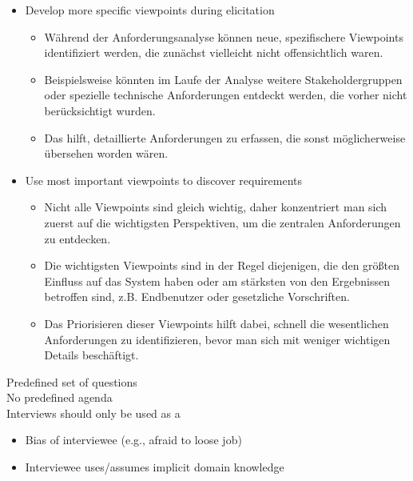 \begin{defBox}[title=Systematic requirement discovery: Viewpoint-oriented Approach]
    \begin{itemize}
        \item Develop more specific viewpoints during elicitation
        \begin{infoBox}
            \begin{itemize}
                \item Während der Anforderungsanalyse können neue, spezifischere Viewpoints identifiziert werden, die zunächst vielleicht nicht offensichtlich waren.
                \item Beispielsweise könnten im Laufe der Analyse weitere Stakeholdergruppen oder spezielle technische Anforderungen entdeckt werden, die vorher nicht berücksichtigt wurden.
                \item Das hilft, detaillierte Anforderungen zu erfassen, die sonst möglicherweise übersehen worden wären.
            \end{itemize}
        \end{infoBox}
        \item Use most important viewpoints to discover requirements
        \begin{infoBox}
            \begin{itemize}
                \item Nicht alle Viewpoints sind gleich wichtig, daher konzentriert man sich zuerst auf die wichtigsten Perspektiven, um die zentralen Anforderungen zu entdecken.
                \item Die wichtigsten Viewpoints sind in der Regel diejenigen, die den größten Einfluss auf das System haben oder am stärksten von den Ergebnissen betroffen sind, z.B. Endbenutzer oder gesetzliche Vorschriften.
                \item Das Priorisieren dieser Viewpoints hilft dabei, schnell die wesentlichen Anforderungen zu identifizieren, bevor man sich mit weniger wichtigen Details beschäftigt.
            \end{itemize}
        \end{infoBox}
    \end{itemize}
\end{defBox}

\begin{defBox}[title=Systematic requirement elicitation: Techniques: Interviews]
     Predefined set of questions\\
     No predefined agenda\\
     Interviews should only be used as a 
    \begin{itemize}
        \item Bias of interviewee (e.g., afraid to loose job)
        \item Interviewee uses/assumes implicit domain knowledge
    \end{itemize}
\end{defBox}

